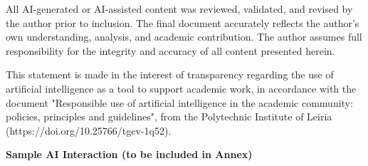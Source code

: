 {{{{            All AI-generated or AI-assisted content was reviewed, validated, and revised by the author prior to inclusion. The final document accurately reflects the author's own understanding, analysis, and academic contribution. The author assumes full responsibility for the integrity and accuracy of all content presented herein.

            This statement is made in the interest of transparency regarding the use of artificial intelligence as a tool to support academic work, in accordance with the document "Responsible use of artificial intelligence in the academic community: policies, principles and guidelines", from the Polytechnic Institute of Leiria (https://doi.org/10.25766/tgcv-1q52).
        
        \vspace{1em}
        
        \noindent\textbf{Sample AI Interaction (to be included in Annex)}
        
        
        }
    }}
    
    \MediaOptionLogicBlank   
}{}
